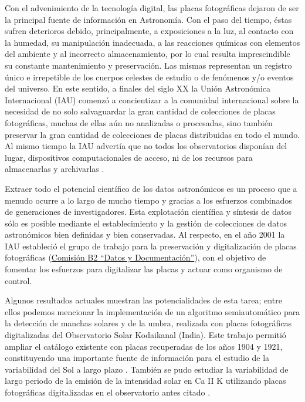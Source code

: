 \documentclass[baaa]{baaa}
\begin{document}
Con el advenimiento de la tecnología digital, las placas fotográficas dejaron de ser la principal fuente de información en Astronomía. Con el paso del tiempo, éstas sufren deterioros debido, principalmente, a exposiciones a la luz, al contacto con la humedad, su manipulación inadecuada, a las reacciones químicas con elementos del ambiente y al incorrecto almacenamiento,
por lo cual resulta imprescindible su constante mantenimiento y preservación. Las mismas representan un registro único e irrepetible de los cuerpos celestes de estudio o de fenómenos y/o eventos del universo. En este sentido, a finales del siglo XX la Unión Astronómica Internacional (IAU) comenzó a concientizar a la comunidad internacional sobre la necesidad de no solo salvaguardar la gran cantidad de colecciones de placas fotográficas, muchas de ellas aún no analizadas o procesadas, sino también preservar la gran cantidad de colecciones de placas distribuidas en todo el mundo. Al mismo tiempo la IAU  advertía que no todos los observatorios disponían del lugar, dispositivos computacionales de acceso, ni de los recursos para almacenarlas y archivarlas \citep{1992HiA.....9..727V}.

Extraer todo el potencial científico de los datos astronómicos es un proceso que a menudo ocurre a lo largo de mucho tiempo y gracias a los esfuerzos combinados de generaciones de investigadores. Esta explotación científica y síntesis de datos sólo es posible mediante el establecimiento y la gestión de colecciones de datos astronómicos bien definidas y bien conservadas. Al respecto, en el año 2001 la IAU estableció el grupo de trabajo para la preservación y digitalización de placas fotográficas
(\href{https://www.iau.org/science/scientific_bodies/working_groups/313/}{Comisión B2 ``Datos y Documentación''}), con el objetivo de fomentar los esfuerzos para digitalizar las placas y actuar como organismo de control.

Algunos resultados actuales muestran las potencialidades de esta tarea; entre ellos podemos mencionar la implementación de un algoritmo semiautomático para la detección de manchas solares y de la umbra, realizada con placas fotográficas digitalizadas del Observatorio Solar Kodaikanal (India). Este trabajo permitió ampliar el catálogo existente con placas recuperadas de los años 1904 y 1921, constituyendo una importante fuente de información para el estudio de la variabilidad del Sol a largo plazo \citep{2022FrASS...919751J}. También se pudo estudiar la variabilidad de largo periodo de la emisión de la intensidad solar en Ca II K utilizando placas fotográficas digitalizadas en el observatorio antes citado \citep{2022ApJ...928...97K}.
\end{document}
